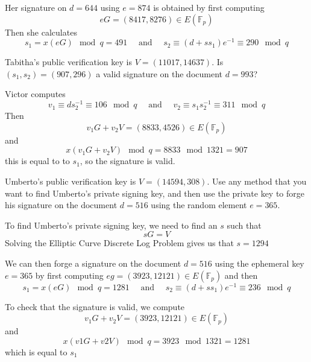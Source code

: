 \documentclass[12pt]{article}
\begin{document}
\noindent
Her signature on $d=644$ using $e=874$ is obtained by first computing
\[eG=(8417,8276)\in E(\mathbb{F}_p)\]
Then she calculates
\[s_1=x(eG)\mod{q}=491\quad\text{ and }\quad s_2\equiv(d+ss_1)e^{-1}\equiv290\mod{q}\]

\subproblem Tabitha's public verification key is $V=(11017,14637)$. Is $(s_1,s_2)=(907,296)$ a valid signature on the document $d=993$?

\solution
Victor computes
\[v_1\equiv ds_2^{-1}\equiv 106\mod{q}\quad\text{ and }\quad v_2\equiv s_1s_2^{-1}\equiv 311\mod{q}\]
Then
\[v_1G+v_2V=(8833,4526)\in E(\mathbb{F}_p)\]
and
\[x(v_1G+v_2V)\mod{q}=8833\mod{1321}=907\]
this is equal to to $s_1$, so the signature is valid.

\newpage
\subproblem Umberto's public verification key is $V=(14594,308)$. Use any method that you want to find Umberto's private signing key, and then use the private key to forge his signature on the document $d=516$ using the random element $e=365$.

\solution
To find Umberto's private signing key, we need to find an $s$ such that
\[sG=V\]
Solving the Elliptic Curve Discrete Log Problem gives us that $s=1294$

\noindent
We can then forge a signature on the document $d=516$ using the ephemeral key $e=365$ by first computing $eg=(3923,12121)\in E(\mathbb{F}_p)$ and then
\[s_1=x(eG)\mod{q}=1281\quad\text{ and }\quad s_2\equiv(d+ss_1)e^{-1}\equiv236\mod{q}\]

\noindent
To check that the signature is valid, we compute
\[v_1G+v_2V=(3923,12121)\in E(\mathbb{F}_p)\]
and
\[x(v1G+v2V)\mod{q}=3923\mod{1321}=1281\]
which is equal to $s_1$
\newpage
\inputminted{python}{ecc_finite.py}
\end{document}

